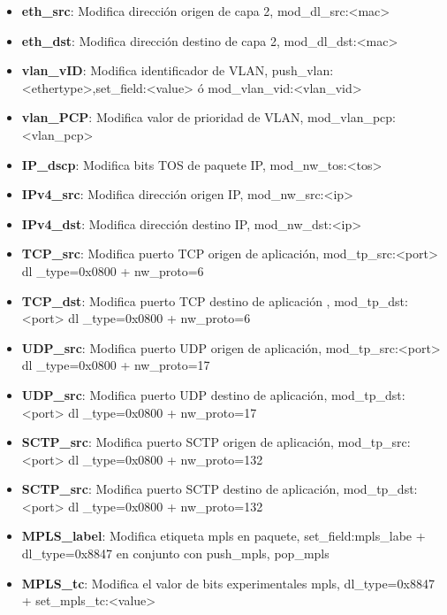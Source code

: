 \begin{itemize}

\item \textbf{eth\_src}: Modifica direcci\'on origen de capa 2, mod\_dl\_src:<mac>

\item \textbf{eth\_dst}: Modifica direcci\'on destino de capa 2, mod\_dl\_dst:<mac>

\item \textbf{vlan\_vID}: Modifica identificador de VLAN, push\_vlan:<ethertype>,set\_field:<value> \'o
                         mod\_vlan\_vid:<vlan\_vid>

\item \textbf{vlan\_PCP}: Modifica valor de prioridad de VLAN, mod\_vlan\_pcp:<vlan\_pcp>

\item \textbf{IP\_dscp}: Modifica bits TOS de paquete IP, mod\_nw\_tos:<tos>

\item \textbf{IPv4\_src}: Modifica direcci\'on origen IP, mod\_nw\_src:<ip>

\item \textbf{IPv4\_dst}: Modifica direcci\'on destino IP, mod\_nw\_dst:<ip>

\item \textbf{TCP\_src}: Modifica puerto TCP origen de aplicaci\'on, mod\_tp\_src:<port> dl
                         \_type=0x0800 + nw\_proto=6

\item \textbf{TCP\_dst}: Modifica puerto TCP destino de aplicaci\'on , mod\_tp\_dst:<port> dl 
                         \_type=0x0800 + nw\_proto=6

\item \textbf{UDP\_src}: Modifica puerto UDP origen de aplicaci\'on, mod\_tp\_src:<port> dl	                    
                         \_type=0x0800 + nw\_proto=17
                         
\item \textbf{UDP\_src}: Modifica puerto UDP destino de aplicaci\'on, mod\_tp\_dst:<port> dl	                    
                         \_type=0x0800 + nw\_proto=17

\item \textbf{SCTP\_src}: Modifica puerto SCTP origen de aplicaci\'on, mod\_tp\_src:<port> dl	                    
                         \_type=0x0800 + nw\_proto=132
                         
\item \textbf{SCTP\_src}: Modifica puerto SCTP destino de aplicaci\'on, mod\_tp\_dst:<port> dl	                    
                         \_type=0x0800 + nw\_proto=132
                         
\item \textbf{MPLS\_label}: Modifica etiqueta mpls en paquete, set\_field:mpls\_labe + dl\_type=0x8847 
							en conjunto con push\_mpls, pop\_mpls 

\item \textbf{MPLS\_tc}: Modifica el valor de bits experimentales mpls, dl\_type=0x8847 + set\_mpls\_tc:<value>

\end{itemize}
